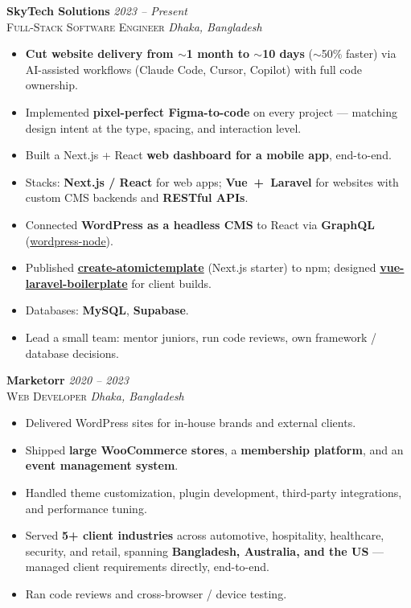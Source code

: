 \documentclass[10pt,letterpaper]{article}
\newcommand{\role}[4]{%
  \noindent\textbf{#1} \hfill \textit{#3}\\
  \textsc{#2} \hfill \textit{#4}\vspace{2pt}
}
\begin{document}
\role{SkyTech Solutions}{Full-Stack Software Engineer}{2023 -- Present}{Dhaka, Bangladesh}
\begin{itemize}
  \item \textbf{Cut website delivery from $\sim$1 month to $\sim$10 days} ($\sim$50\% faster) via AI-assisted workflows (Claude Code, Cursor, Copilot) with full code ownership.
  \item Implemented \textbf{pixel-perfect Figma-to-code} on every project — matching design intent at the type, spacing, and interaction level.
  \item Built a Next.js + React \textbf{web dashboard for a mobile app}, end-to-end.
  \item Stacks: \textbf{Next.js / React} for web apps; \textbf{Vue~+~Laravel} for websites with custom CMS backends and \textbf{RESTful APIs}.
  \item Connected \textbf{WordPress as a headless CMS} to React via \textbf{GraphQL} (\href{https://github.com/nomanjawad/wordpress-node}{wordpress-node}).
  \item Published \href{https://www.npmjs.com/package/create-atomictemplate}{\textbf{create-atomictemplate}} (Next.js starter) to npm; designed \href{https://github.com/nomanjawad/vue-laravel-boilerplate}{\textbf{vue-laravel-boilerplate}} for client builds.
  \item Databases: \textbf{MySQL}, \textbf{Supabase}.
  \item Lead a small team: mentor juniors, run code reviews, own framework / database decisions.
\end{itemize}

\vspace{4pt}
\role{Marketorr}{Web Developer}{2020 -- 2023}{Dhaka, Bangladesh}
\begin{itemize}
  \item Delivered WordPress sites for in-house brands and external clients.
  \item Shipped \textbf{large WooCommerce stores}, a \textbf{membership platform}, and an \textbf{event management system}.
  \item Handled theme customization, plugin development, third-party integrations, and performance tuning.
  \item Served \textbf{5+ client industries} across automotive, hospitality, healthcare, security, and retail, spanning \textbf{Bangladesh, Australia, and the US} — managed client requirements directly, end-to-end.
  \item Ran code reviews and cross-browser / device testing.
\end{itemize}
\end{document}
